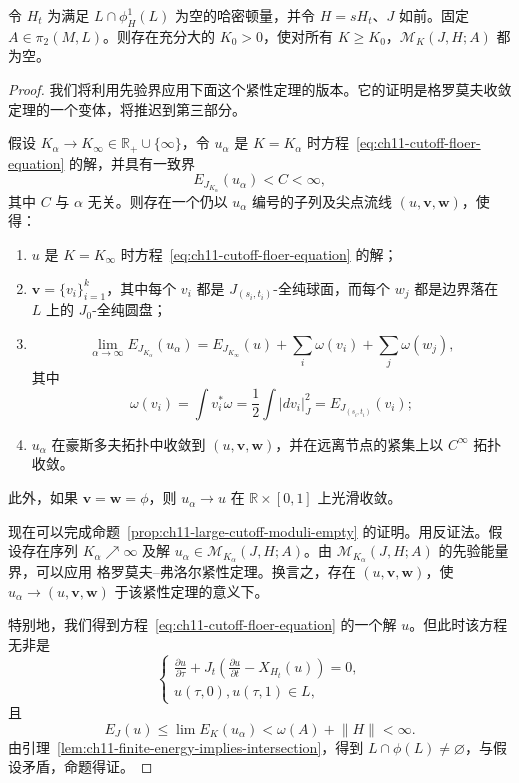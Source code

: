 \begin{proposition}\label{prop:ch11-large-cutoff-moduli-empty}
令 $H_t$ 为满足 $L\cap\phi_H^1(L)$ 为空的哈密顿量，并令
$H=sH_t$、$J$ 如前。固定 $A\in\pi_2(M,L)$。则存在充分大的
$K_0>0$，使对所有 $K\geq K_0$，$\mathcal M_K(J,H;A)$ 都为空。
\end{proposition}

\begin{proof}
我们将利用先验界应用下面这个紧性定理的版本。它的证明是格罗莫夫收敛定理的一个变体，将推迟到第三部分。

\begin{theorem}\label{thm:ch11-gromov-floer-compactness}
假设 $K_\alpha\to K_\infty\in\mathbb R_+\cup\{\infty\}$，令 $u_\alpha$ 是
$K=K_\alpha$ 时方程~\eqref{eq:ch11-cutoff-floer-equation} 的解，并具有一致界
\[
 E_{J_{K_\alpha}}(u_\alpha)<C<\infty,
\]
其中 $C$ 与 $\alpha$ 无关。则存在一个仍以 $u_\alpha$ 编号的子列及尖点流线
$(u,\mathbf v,\mathbf w)$，使得：
\begin{enumerate}[label=(\arabic*)]
 \item $u$ 是 $K=K_\infty$ 时方程~\eqref{eq:ch11-cutoff-floer-equation} 的解；
 \item $\mathbf v=\{v_i\}_{i=1}^k$，其中每个 $v_i$ 都是
 $J_{(s_i,t_i)}$-全纯球面，而每个 $w_j$ 都是边界落在 $L$ 上的
 $J_0$-全纯圆盘；
 \item
 \[
  \lim_{\alpha\to\infty}E_{J_{K_\alpha}}(u_\alpha)
  =E_{J_{K_\infty}}(u)+\sum_i\omega(v_i)+\sum_j\omega(w_j),
 \]
 其中
 \[
  \omega(v_i)=\int v_i^*\omega
  =\frac12\int|dv_i|_J^2
  =E_{J_{(s_i,t_i)}}(v_i);
 \]
 \item $u_\alpha$ 在豪斯多夫拓扑中收敛到 $(u,\mathbf v,\mathbf w)$，并在远离节点的紧集上以 $C^\infty$ 拓扑收敛。
\end{enumerate}
此外，如果 $\mathbf v=\mathbf w=\phi$，则
$u_\alpha\to u$ 在 $\mathbb R\times[0,1]$ 上光滑收敛。
\end{theorem}

现在可以完成命题~\ref{prop:ch11-large-cutoff-moduli-empty} 的证明。用反证法。假设存在序列
$K_\alpha\nearrow\infty$ 及解
$u_\alpha\in\mathcal M_{K_\alpha}(J,H;A)$。由
$\mathcal M_{K_\alpha}(J,H;A)$ 的先验能量界，可以应用
格罗莫夫--弗洛尔紧性定理。换言之，存在 $(u,\mathbf v,\mathbf w)$，使
$u_\alpha\to(u,\mathbf v,\mathbf w)$ 于该紧性定理的意义下。

特别地，我们得到方程~\eqref{eq:ch11-cutoff-floer-equation} 的一个解 $u$。但此时该方程无非是
\[
 \begin{cases}
  \displaystyle\frac{\partial u}{\partial\tau}
  +J_t\left(\frac{\partial u}{\partial t}-X_{H_t}(u)\right)=0,\\[5pt]
  u(\tau,0),u(\tau,1)\in L,
 \end{cases}
\]
且
\[
 E_J(u)\leq\lim E_K(u_\alpha)<\omega(A)+\lVert H\rVert<\infty.
\]
由引理~\ref{lem:ch11-finite-energy-implies-intersection}，得到
$L\cap\phi(L)\ne\varnothing$，与假设矛盾，命题得证。
\end{proof}

